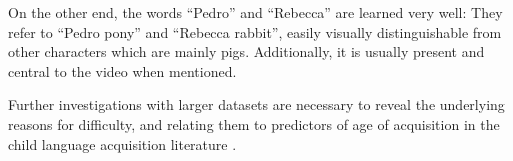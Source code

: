 On the other end, the words ``Pedro'' and ``Rebecca'' are learned very well: 
They refer to ``Pedro pony'' and ``Rebecca rabbit'', easily visually 
distinguishable from other characters which are mainly pigs. Additionally, it 
is usually present and central to the video when mentioned.

Further investigations with larger datasets are necessary to reveal the 
underlying reasons for difficulty, and relating them to predictors of age of 
acquisition in the child language acquisition literature 
\cite{roy2015predicting,frank2021variability}. 


